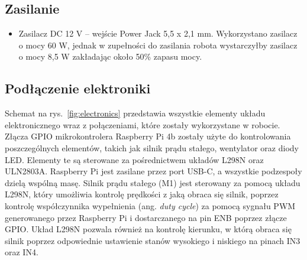 \subsection{Zasilanie}
\begin{itemize}
    \item Zasilacz DC 12 V -- wejście Power Jack 5,5 x 2,1 mm. Wykorzystano zasilacz o mocy 60 W, jednak w zupełności do zasilania robota wystarczyłby zasilacz o mocy 8,5 W zakładając około 50\% zapasu mocy.
\end{itemize}

\subsection{Podłączenie elektroniki}

Schemat na rys.~\ref{fig:electronics} przedstawia wszystkie elementy układu elektronicznego wraz z połączeniami, które zostały wykorzystane w robocie.
Złącza GPIO mikrokontrolera Raspberry Pi 4b zostały użyte do kontrolowania poszczególnych elementów, takich jak silnik prądu stałego, wentylator oraz diody LED. Elementy te są sterowane za 
pośrednictwem układów L298N oraz ULN2803A. Raspberry Pi jest zasilane przez port USB-C, a wszystkie podzespoły dzielą wspólną masę.
Silnik prądu stałego (M1) jest sterowany za pomocą układu L298N, który umożliwia kontrolę prędkości z jaką obraca się silnik, poprzez kontrolę współczynnika wypełnienia (ang. \textit{duty cycle})
za pomocą sygnału PWM generowanego przez Raspberry Pi i dostarczanego na pin ENB poprzez złącze GPIO. Układ L298N pozwala również na kontrolę kierunku, w którą obraca się silnik poprzez
odpowiednie ustawienie stanów wysokiego i niskiego na pinach IN3 oraz IN4.

